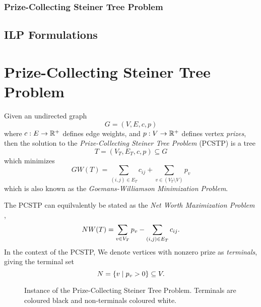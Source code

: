 \subsubsection{Prize-Collecting Steiner Tree Problem}

\subsection{ILP Formulations}
\section{Prize-Collecting Steiner Tree Problem}
Given an undirected graph
$$G = (V, E, c, p)$$
where $c: E \to \mathbb{R}^+$ defines edge weights,
and $p: V \to \mathbb{R}^+$ defines vertex \textit{prizes}, then the solution to the \textit{Prize-Collecting
  Steiner Tree Problem} (PCSTP) is a tree
$$T = (V_T, E_T, c, p) \subseteq G$$
which minimizes
$$GW(T) = \sum_{(i,j) \in E_T} c_{ij} + \sum_{v\in (V_T \setminus V)} p_v$$
which is also known as the {\textit{Goemans-Williamson Minimization Problem}}.

The PCSTP can equilvalently be stated as the {\textit{Net Worth Maximization Problem}} \citep{Johnson:2000:PCS:338219.338637},
$$NW(T) = \sum_{v \in V_T} p_v - \sum_{(i,j) \in E_T} c_{ij} \mathnormal{.}$$
In the context of the PCSTP, We denote vertices with nonzero prize as \textit{terminals}, giving the terminal set
$$N = \{v \mid p_v > 0\} \subseteq V\mathnormal{.}$$

\begin{figure}[h]\centering
{}
\caption{Instance of the Prize-Collecting Steiner Tree Problem. Terminals are coloured black and non-terminals coloured white.}
\label{fig:pcstp:01}
\end{figure}

